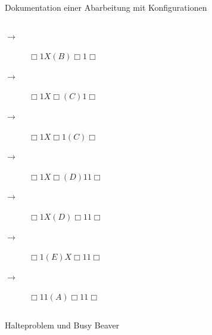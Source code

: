 \begin{frame}{Dokumentation einer Abarbeitung mit Konfigurationen}
\begin{columns}
		\begin{column}{0.4\textwidth}
			\begin{description}
				\pause\item[$\rightarrow$] $\Box 1 X (B) \Box 1\Box$
				\pause\item[$\rightarrow$] $\Box 1 X \Box (C) 1\Box$
				\pause\item[$\rightarrow$] $\Box 1 X \Box 1 (C)\Box$
				\pause\item[$\rightarrow$] $\Box 1 X \Box (D) 1 1\Box$
				\pause\item[$\rightarrow$] $\Box 1 X (D) \Box 1 1\Box$
				\pause\item[$\rightarrow$] $\Box 1 (E) X \Box 1 1\Box$
				\pause\item[$\rightarrow$] $\Box 1 1 (A) \Box 1 1\Box$
			\end{description}
		\end{column}
	\end{columns}
\end{frame}

\begin{frame}{Halteproblem und Busy Beaver}
\end{frame}

